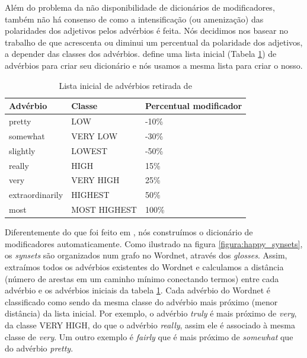 \documentclass[template.tex]{subfiles}
\begin{document}
Além do problema da não disponibilidade de dicionários de modificadores, também não há consenso de como a intensificação (ou amenização) das polaridades dos adjetivos pelos advérbios é feita. Nós decidimos nos basear no trabalho de  que acrescenta ou diminui um percentual da polaridade dos adjetivos, a depender das classes dos advérbios.  define uma lista inicial (Tabela \ref{table:adv_seed}) de advérbios para criar seu dicionário e nós usamos a mesma lista para criar o nosso.

\begin{table}[!h]
	\centering
    \begin{tabular}{lll}
    Advérbio         				& Classe          & Percentual modificador \\ \hline
    pretty                   			& LOW 			   & -10\% \\
    somewhat                   	& VERY LOW  & -30\% \\
    slightly                   		& LOWEST 	   & -50\% \\
    really                   			& HIGH 			   & 15\% \\
    very                   			& VERY HIGH &  25\% \\
    extraordinarily             & HIGHEST 	   & 50\% \\
    most                   			& MOST HIGHEST & 100\% \\
    \end{tabular}
    \caption{Lista inicial de advérbios retirada de }
	\label{table:adv_seed}
\end{table}

Diferentemente do que foi feito em , nós construímos o dicionário de modificadores automaticamente. Como ilustrado na figura \ref{figura:happy_synsets}, os \textit{synsets} são organizados num grafo no Wordnet, através dos \textit{glosses}. Assim, extraímos todos os advérbios existentes do Wordnet e calculamos a distância (número de arestas em um caminho mínimo conectando termos) entre cada advérbio e os advérbios iniciais da tabela \ref{table:adv_seed}. Cada advérbio do Wordnet é classificado como sendo da mesma classe do advérbio mais próximo (menor distância) da lista inicial. Por exemplo, o advérbio \textit{truly} é mais próximo de \textit{very}, da classe VERY HIGH, do que o advérbio \textit{really}, assim ele é associado à mesma classe de \textit{very}. Um outro exemplo é \textit{fairly} que é mais próximo de \textit{somewhat} que do advérbio \textit{pretty}. 
\end{document}
